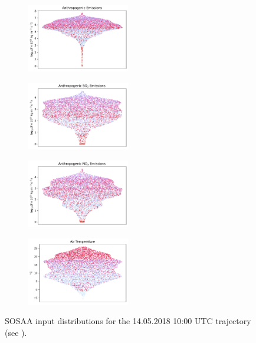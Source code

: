 \begin{figure}[H]
    \begin{subfigure}
        \centering
        \includegraphics[width=0.49\textwidth,valign=t]{sosaa-data/figures/trajectories/trajectory-14.05.2018:10.00-anthropogenic.pdf}
    \end{subfigure}
    \begin{subfigure}
        \centering
        \includegraphics[width=0.49\textwidth,valign=t]{sosaa-data/figures/trajectories/trajectory-14.05.2018:10.00-so2.pdf}
    \end{subfigure}

    \begin{subfigure}
        \centering
        \includegraphics[width=0.49\textwidth,valign=t]{sosaa-data/figures/trajectories/trajectory-14.05.2018:10.00-nox.pdf}
    \end{subfigure}
    \begin{subfigure}
        \centering
        \includegraphics[width=0.49\textwidth,valign=t]{sosaa-data/figures/trajectories/trajectory-14.05.2018:10.00-temperature.pdf}
    \end{subfigure}

    \caption[Inputs for the 14.05.2018 10:00 UTC Trajectory]{SOSAA input distributions for the 14.05.2018 10:00 UTC trajectory (see ).}
    \label{fig:trajectory-inputs-14-05}
\end{figure}

